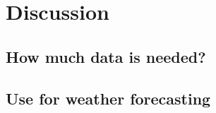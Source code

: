 \section{Discussion}
\label{sec:discussion}

\subsection{How much data is needed?}

\subsection{Use for weather forecasting}